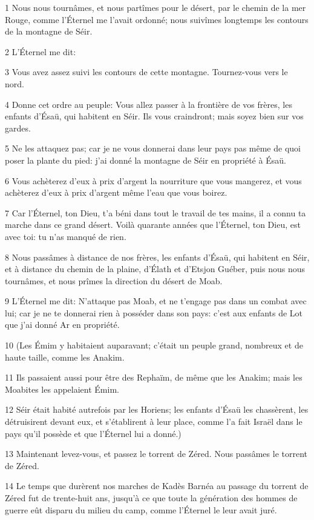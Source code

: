 \par 1 Nous nous tournâmes, et nous partîmes pour le désert, par le chemin de la mer Rouge, comme l'Éternel me l'avait ordonné; nous suivîmes longtemps les contours de la montagne de Séir.
\par 2 L'Éternel me dit:
\par 3 Vous avez assez suivi les contours de cette montagne. Tournez-vous vers le nord.
\par 4 Donne cet ordre au peuple: Vous allez passer à la frontière de vos frères, les enfants d'Ésaü, qui habitent en Séir. Ils vous craindront; mais soyez bien sur vos gardes.
\par 5 Ne les attaquez pas; car je ne vous donnerai dans leur pays pas même de quoi poser la plante du pied: j'ai donné la montagne de Séir en propriété à Ésaü.
\par 6 Vous achèterez d'eux à prix d'argent la nourriture que vous mangerez, et vous achèterez d'eux à prix d'argent même l'eau que vous boirez.
\par 7 Car l'Éternel, ton Dieu, t'a béni dans tout le travail de tes mains, il a connu ta marche dans ce grand désert. Voilà quarante années que l'Éternel, ton Dieu, est avec toi: tu n'as manqué de rien.
\par 8 Nous passâmes à distance de nos frères, les enfants d'Ésaü, qui habitent en Séir, et à distance du chemin de la plaine, d'Élath et d'Etsjon Guéber, puis nous nous tournâmes, et nous prîmes la direction du désert de Moab.
\par 9 L'Éternel me dit: N'attaque pas Moab, et ne t'engage pas dans un combat avec lui; car je ne te donnerai rien à posséder dans son pays: c'est aux enfants de Lot que j'ai donné Ar en propriété.
\par 10 (Les Émim y habitaient auparavant; c'était un peuple grand, nombreux et de haute taille, comme les Anakim.
\par 11 Ils passaient aussi pour être des Rephaïm, de même que les Anakim; mais les Moabites les appelaient Émim.
\par 12 Séir était habité autrefois par les Horiens; les enfants d'Ésaü les chassèrent, les détruisirent devant eux, et s'établirent à leur place, comme l'a fait Israël dans le pays qu'il possède et que l'Éternel lui a donné.)
\par 13 Maintenant levez-vous, et passez le torrent de Zéred. Nous passâmes le torrent de Zéred.
\par 14 Le temps que durèrent nos marches de Kadès Barnéa au passage du torrent de Zéred fut de trente-huit ans, jusqu'à ce que toute la génération des hommes de guerre eût disparu du milieu du camp, comme l'Éternel le leur avait juré.
